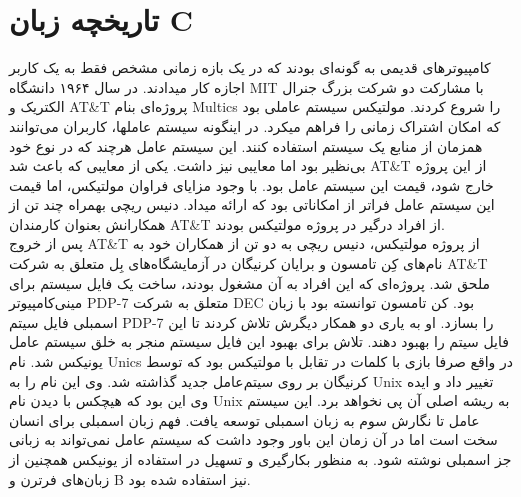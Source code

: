 \chapter{تاریخچه زبان C}
کامپیوترهای قدیمی به گونه‌ای بودند که در یک بازه زمانی مشخص فقط به یک کاربر اجازه کار میدادند. در سال ۱۹۶۴ دانشگاه MIT با مشارکت دو شرکت بزرگ جنرال الکتریک و AT\&T پروژه‌ای بنام Multics را شروع کردند. مولتیکس سیستم عاملی بود که امکان اشتراک زمانی را فراهم میکرد. در اینگونه سیستم عاملها، کاربران می‌توانند همزمان از منابع یک سیستم استفاده کنند. این سیستم عامل هرچند که در نوع خود بی‌نظیر بود اما معایبی نیز داشت. یکی از معایبی که باعث شد AT\&T از این پروژه خارج شود، قیمت این سیستم عامل بود. با وجود مزایای فراوان مولتیکس، اما قیمت این سیستم عامل فراتر از امکاناتی بود که ارائه میداد. دنیس ریچی بهمراه چند تن از همکارانش بعنوان کارمندان AT\&T از افراد درگیر در پروژه مولتیکس بودند.\\پس از خروج AT\&T از پروژه مولتیکس،‌ دنیس ریچی به دو تن از همکاران خود به نام‌های کِن تامسون و برایان کرنیگان در آزمایشگاه‌های بِل متعلق به شرکت AT\&T ملحق شد. پروژه‌ای که این افراد به آن مشغول بودند، ساخت یک فایل سیستم  برای مینی‌کامپیوتر PDP-7 متعلق به شرکت DEC بود. کن تامسون توانسته بود با زبان اسمبلی فایل سیتم PDP-7 را بسازد. او به یاری دو همکار دیگرش تلاش کردند تا این فایل سیتم را بهبود دهند. تلاش برای بهبود این فایل سیستم منجر به خلق سیستم عامل یونیکس  شد. نام Unics در واقع صرفا بازی با کلمات در تقابل با مولتیکس بود که توسط کرنیگان بر روی سیتم‌عامل جدید گذاشته شد. وی این نام را به Unix تغییر داد و ایده وی این بود که هیچکس با دیدن نام Unix به ریشه اصلی آن پی نخواهد برد. این سیستم عامل تا نگارش سوم به زبان اسمبلی توسعه یافت. فهم زبان اسمبلی برای انسان سخت است اما در آن زمان این باور وجود داشت که سیستم عامل نمی‌تواند به زبانی جز اسمبلی نوشته شود. به منظور بکارگیری و تسهیل در استفاده از یونیکس همچنین از زبان‌های فرترن و B نیز استفاده شده بود.

